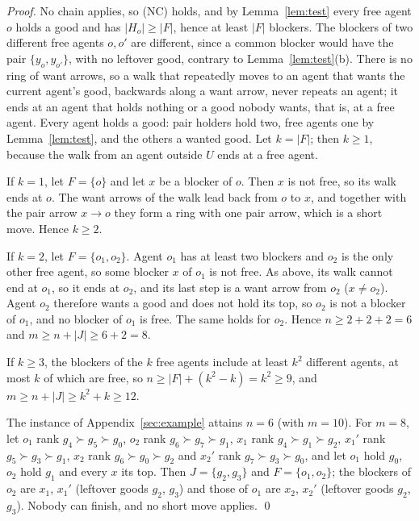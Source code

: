 \documentclass[runningheads,11pt]{llncs}
\begin{document}
\begin{proof}
No chain applies, so (NC) holds, and by Lemma~\ref{lem:test} every free agent $o$ holds a good and has $|H_o|\ge|F|$, hence at least $|F|$ blockers. The blockers of two different free agents $o,o'$ are different, since a common blocker would have the pair $\{y_o,y_{o'}\}$, with no leftover good, contrary to Lemma~\ref{lem:test}(b). There is no ring of want arrows, so a walk that repeatedly moves to an agent that wants the current agent's good, backwards along a want arrow, never repeats an agent; it ends at an agent that holds nothing or a good nobody wants, that is, at a free agent. Every agent holds a good: pair holders hold two, free agents one by Lemma~\ref{lem:test}, and the others a wanted good. Let $k=|F|$; then $k\ge1$, because the walk from an agent outside $U$ ends at a free agent.

If $k=1$, let $F=\{o\}$ and let $x$ be a blocker of $o$. Then $x$ is not free, so its walk ends at $o$. The want arrows of the walk lead back from $o$ to $x$, and together with the pair arrow $x\to o$ they form a ring with one pair arrow, which is a short move. Hence $k\ge2$.

If $k=2$, let $F=\{o_1,o_2\}$. Agent $o_1$ has at least two blockers and $o_2$ is the only other free agent, so some blocker $x$ of $o_1$ is not free. As above, its walk cannot end at $o_1$, so it ends at $o_2$, and its last step is a want arrow from $o_2$ ($x\ne o_2$). Agent $o_2$ therefore wants a good and does not hold its top, so $o_2$ is not a blocker of $o_1$, and no blocker of $o_1$ is free. The same holds for $o_2$. Hence $n\ge2+2+2=6$ and $m\ge n+|J|\ge6+2=8$.

If $k\ge3$, the blockers of the $k$ free agents include at least $k^2$ different agents, at most $k$ of which are free, so $n\ge|F|+(k^2-k)=k^2\ge9$, and $m\ge n+|J|\ge k^2+k\ge12$.

The instance of Appendix~\ref{sec:example} attains $n=6$ (with $m=10$). For $m=8$, let $o_1$ rank $g_4\succ g_5\succ g_0$, $o_2$ rank $g_6\succ g_7\succ g_1$, $x_1$ rank $g_4\succ g_1\succ g_2$, $x_1'$ rank $g_5\succ g_3\succ g_1$, $x_2$ rank $g_6\succ g_0\succ g_2$ and $x_2'$ rank $g_7\succ g_3\succ g_0$, and let $o_1$ hold $g_0$, $o_2$ hold $g_1$ and every $x$ its top. Then $J=\{g_2,g_3\}$ and $F=\{o_1,o_2\}$; the blockers of $o_2$ are $x_1$, $x_1'$ (leftover goods $g_2$, $g_3$) and those of $o_1$ are $x_2$, $x_2'$ (leftover goods $g_2$, $g_3$). Nobody can finish, and no short move applies. \qed
\end{proof}
\end{document}
